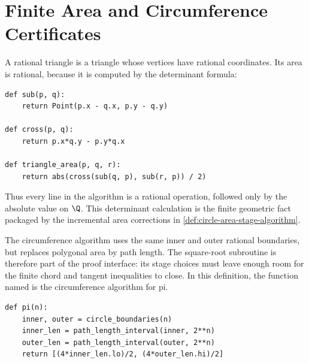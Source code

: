 \section{Finite Area and Circumference Certificates}

\begin{definition}\label{def:rational-triangle-area}
A rational triangle is a triangle whose vertices have rational coordinates.
Its area is rational, because it is computed by the determinant formula:
\begin{verbatim}
def sub(p, q):
    return Point(p.x - q.x, p.y - q.y)

def cross(p, q):
    return p.x*q.y - p.y*q.x

def triangle_area(p, q, r):
    return abs(cross(sub(q, p), sub(r, p)) / 2)
\end{verbatim}
Thus every line in the algorithm is a rational operation, followed only by
the absolute value on \(\Q\).  This determinant calculation is the finite
geometric fact packaged by the incremental area corrections in
\cref{def:circle-area-stage-algorithm}.
\end{definition}

\begin{definition}\label{def:circle-circumference-stage-algorithm}
The circumference algorithm uses the same inner and outer rational boundaries,
but replaces polygonal area by path length.  The square-root subroutine is
therefore part of the proof interface: its stage choices must leave enough
room for the finite chord and tangent inequalities to close.  In this
definition, the function named  is the circumference algorithm for
pi.
\begin{verbatim}
def pi(n):
    inner, outer = circle_boundaries(n)
    inner_len = path_length_interval(inner, 2**n)
    outer_len = path_length_interval(outer, 2**n)
    return [(4*inner_len.lo)/2, (4*outer_len.hi)/2]
\end{verbatim}
\end{definition}

